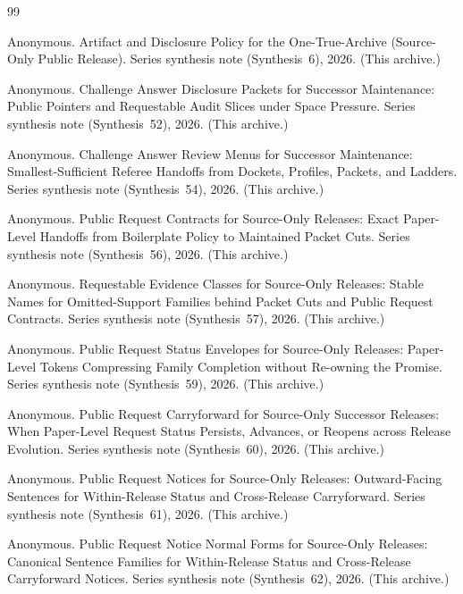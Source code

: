 \documentclass[11pt]{article}
\begin{document}
\begin{thebibliography}{99}\small

Anonymous.
\newblock Artifact and Disclosure Policy for the One-True-Archive (Source-Only Public Release).
\newblock Series synthesis note (Synthesis~6), 2026. (This archive.)

Anonymous.
\newblock Challenge Answer Disclosure Packets for Successor Maintenance: Public Pointers and Requestable Audit Slices under Space Pressure.
\newblock Series synthesis note (Synthesis~52), 2026. (This archive.)

Anonymous.
\newblock Challenge Answer Review Menus for Successor Maintenance: Smallest-Sufficient Referee Handoffs from Dockets, Profiles, Packets, and Ladders.
\newblock Series synthesis note (Synthesis~54), 2026. (This archive.)

Anonymous.
\newblock Public Request Contracts for Source-Only Releases: Exact Paper-Level Handoffs from Boilerplate Policy to Maintained Packet Cuts.
\newblock Series synthesis note (Synthesis~56), 2026. (This archive.)

Anonymous.
\newblock Requestable Evidence Classes for Source-Only Releases: Stable Names for Omitted-Support Families behind Packet Cuts and Public Request Contracts.
\newblock Series synthesis note (Synthesis~57), 2026. (This archive.)


Anonymous.
\newblock Public Request Status Envelopes for Source-Only Releases: Paper-Level Tokens Compressing Family Completion without Re-owning the Promise.
\newblock Series synthesis note (Synthesis~59), 2026. (This archive.)

Anonymous.
\newblock Public Request Carryforward for Source-Only Successor Releases: When Paper-Level Request Status Persists, Advances, or Reopens across Release Evolution.
\newblock Series synthesis note (Synthesis~60), 2026. (This archive.)

Anonymous.
\newblock Public Request Notices for Source-Only Releases: Outward-Facing Sentences for Within-Release Status and Cross-Release Carryforward.
\newblock Series synthesis note (Synthesis~61), 2026. (This archive.)

Anonymous.
\newblock Public Request Notice Normal Forms for Source-Only Releases: Canonical Sentence Families for Within-Release Status and Cross-Release Carryforward Notices.
\newblock Series synthesis note (Synthesis~62), 2026. (This archive.)


\end{thebibliography}
\end{document}
